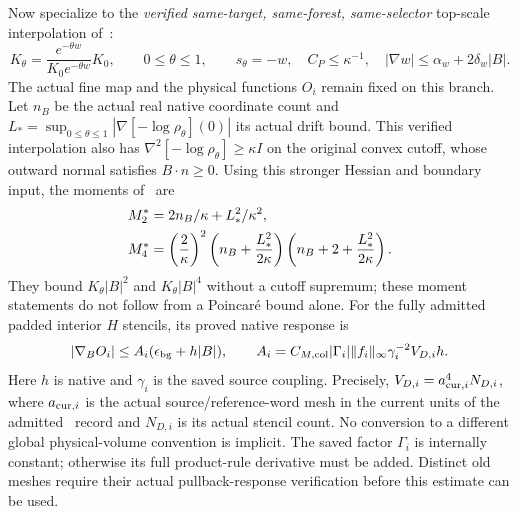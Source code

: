 \documentclass[11pt,letterpaper]{article}
\theoremstyle{plain}
\theoremstyle{remark}\newtheorem{remark}[theorem]{Scope}
\begin{document}
Now specialize to the \emph{verified same-target, same-forest, same-selector}
top-scale interpolation of~\cite[\S4]{ND}:
\begin{equation}
K_\theta=\frac{e^{-\theta w}}{K_0e^{-\theta w}}K_0,
\qquad0\le\theta\le1,\qquad s_\theta=-w,
\quad C_P\le\kappa^{-1},\quad
|\nabla w|\le\alpha_w+2\delta_w|B|.
\label{eq:actualtilt}
\end{equation}
The actual fine map and the physical functions $O_i$ remain fixed on this branch.
Let $n_B$ be the actual real native coordinate count and
$L_*=\sup_{0\le\theta\le1}|\nabla[-\log\rho_\theta](0)|$ its actual drift bound.
This verified interpolation also has
$\nabla^2[-\log\rho_\theta]\ge\kappa I$ on the original convex cutoff,
whose outward normal satisfies $B\cdot n\ge0$.
Using this stronger Hessian and boundary input, the moments of~\cite[\S3.1]{ND} are
\begin{align}
M_2^*&=2n_B/\kappa+L_*^2/\kappa^2,\notag\\
M_4^*&=\left(\frac2\kappa\right)^2
\left(n_B+\frac{L_*^2}{2\kappa}\right)
\left(n_B+2+\frac{L_*^2}{2\kappa}\right).
\label{eq:nativemoments}
\end{align}
They bound $K_\theta|B|^2$ and $K_\theta|B|^4$ without a cutoff supremum;
these moment statements do not follow from a Poincar\'e bound alone.
For the fully admitted padded interior $H$ stencils, its proved native response is
\begin{equation}
|\nabla_BO_i|\le A_i(\epsilon_{\rm bg}+h|B|),\qquad
A_i=C_{M,\rm col}|\Gamma_i|\|f_i\|_\infty
\gamma_i^{-2}V_{D,i}h.
\label{eq:actualHgradient}
\end{equation}
Here $h$ is native and $\gamma_i$ is the saved source coupling. Precisely,
$V_{D,i}=a_{{\rm cur},i}^4N_{D,i}$, where $a_{{\rm cur},i}$ is the actual
source/reference-word mesh in the current units of the admitted~\cite[\S3]{ND}
record and $N_{D,i}$ is its actual stencil count. No conversion to a different
global physical-volume convention is implicit. The saved factor $\Gamma_i$ is internally
constant; otherwise its full product-rule derivative must be added. Distinct old
meshes require their actual pullback-response verification before this estimate
can be used.
\end{document}

